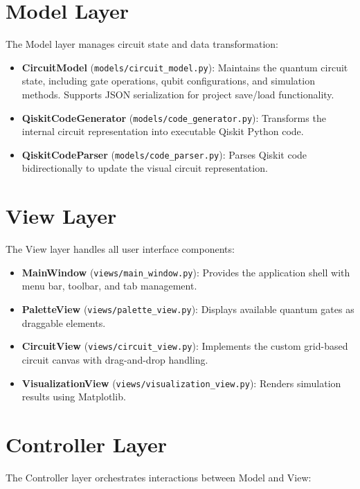 \documentclass[12pt, a4paper, oneside]{report}
\theoremstyle{plain}
\theoremstyle{definition}
\theoremstyle{remark}
\begin{document}
\section{Model Layer}

The Model layer manages circuit state and data transformation:

\begin{itemize}
	\item \textbf{CircuitModel} (\texttt{models/circuit\_model.py}): Maintains the quantum circuit state, including gate operations, qubit configurations, and simulation methods. Supports JSON serialization for project save/load functionality.
	\item \textbf{QiskitCodeGenerator} (\texttt{models/code\_generator.py}): Transforms the internal circuit representation into executable Qiskit Python code.
	\item \textbf{QiskitCodeParser} (\texttt{models/code\_parser.py}): Parses Qiskit code bidirectionally to update the visual circuit representation.
\end{itemize}

\section{View Layer}

The View layer handles all user interface components:

\begin{itemize}
	\item \textbf{MainWindow} (\texttt{views/main\_window.py}): Provides the application shell with menu bar, toolbar, and tab management.
	\item \textbf{PaletteView} (\texttt{views/palette\_view.py}): Displays available quantum gates as draggable elements.
	\item \textbf{CircuitView} (\texttt{views/circuit\_view.py}): Implements the custom grid-based circuit canvas with drag-and-drop handling.
	\item \textbf{VisualizationView} (\texttt{views/visualization\_view.py}): Renders simulation results using Matplotlib.
\end{itemize}

\section{Controller Layer}

The Controller layer orchestrates interactions between Model and View:
\end{document}

